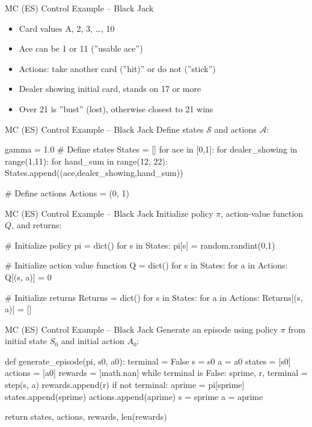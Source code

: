 \documentclass[ignorenonframetext,xcolor=x11names]{beamer}
\begin{document}
\begin{frame}[label=full]{MC (ES) Control Example -- Black Jack}
\begin{itemize}
   \item Card values A, 2, 3, \ldots, 10
   \item Ace can be 1 or 11 (''usable ace'')
   \item Actions: take another card (''hit)'' or do not (''stick'')
   \item Dealer showing initial card, stands on 17 or more
   \item Over 21 is ''bust'' (lost), otherwise closest to 21 wins
\end{itemize}
\end{frame}

\begin{frame}[label=withcode,fragile]{MC (ES) Control Example -- Black Jack}
Define states $\mathcal{S}$ and actions $\mathcal{A}$:
\begin{pythoncode}
gamma = 1.0
# Define states
States = []
for ace in [0,1]:
    for dealer_showing in range(1,11):
        for hand_sum in range(12, 22):
            States.append((ace,dealer_showing,hand_sum))

# Define actions
Actions = (0, 1)
\end{pythoncode}
\end{frame}

\begin{frame}[label=withcode,fragile]{MC (ES) Control Example -- Black Jack}
Initialize policy $\pi$, action-value function $Q$, and returns:
\begin{pythoncode}
# Initialize policy
pi = dict()
for s in States:
    pi[s] = random.randint(0,1)

# Initialize action value function
Q = dict()
for s in States:
    for a in Actions:
        Q[(s, a)] = 0

# Initialize returns
Returns = dict()
for s in States:
    for a in Actions:
        Returns[(s, a)] = []
\end{pythoncode}
\end{frame}


\begin{frame}[label=withcode,fragile]{MC (ES) Control Example -- Black Jack}
Generate an episode using policy $\pi$ from initial state $S_0$ and initial action $A_0$:
\begin{pythoncode}
def generate_episode(pi, s0, a0):
    terminal = False
    s = s0
    a = a0
    states = [s0]
    actions = [a0]
    rewards = [math.nan]
    while terminal is False:
        sprime, r, terminal = step(s, a)
        rewards.append(r)
        if not terminal:
            aprime = pi[sprime]
            states.append(sprime)
            actions.append(aprime)
            s = sprime
            a = aprime

    return states, actions, rewards, len(rewards)
\end{pythoncode}
\end{frame}
\end{document}
